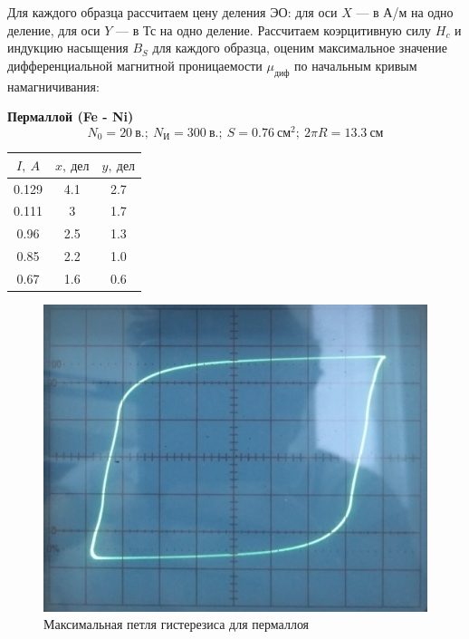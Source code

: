 \documentclass[a4paper, fontsize=14pt]{article}
\begin{document}
Для каждого образца рассчитаем цену деления ЭО: для оси $X$ --- в А/м на одно деление, для оси $Y$ --- в Тс на одно деление. Рассчитаем коэрцитивную силу $H_c$ и индукцию насыщения $B_S$ для каждого образца, оценим максимальное значение дифференциальной магнитной проницаемости $\mu_\text{диф}$ по начальным кривым намагничивания:

\textbf{Пермаллой (Fe - Ni)}
\[
	N_0 = 20\ \text{в.};\ N_\text{И} = 300\ \text{в.};\ S = 0.76\ \text{см}^2;\ 2 \pi R = 13.3\ \text{см}
\]
\begin{table}[H]
	\centering
	\begin{tabular}{|c|c|c|} \hline
		$I,\ A$ &  $x,\ \text{дел}$ & $y,\ \text{дел}$ \\\hline
		0.129 & 4.1 & 2.7 \\\hline
		0.111 & 3 & 1.7 \\\hline
		0.96 & 2.5 & 1.3 \\\hline
		0.85 & 2.2 & 1.0 \\\hline
		0.67 & 1.6 & 0.6 \\\hline
	\end{tabular}	
\end{table}
\begin{figure}[H]
\center
\includegraphics[scale=0.1]{per1.jpg}
\caption{Максимальная петля гистерезиса для пермаллоя}
\end{figure}
\end{document}
